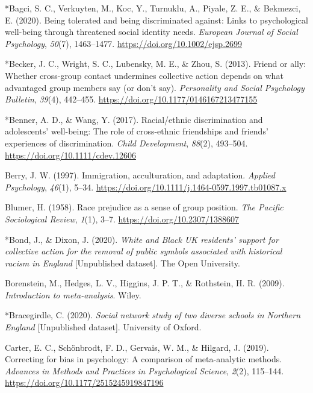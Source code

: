 \documentclass[12pt, letterpaper]{article}
\begin{document}
\leavevmode\hypertarget{ref-2396}{}%
*Bagci, S. C., Verkuyten, M., Koc, Y., Turnuklu, A., Piyale, Z. E., \&
Bekmezci, E. (2020). Being tolerated and being discriminated against:
Links to psychological well-being through threatened social identity
needs. \emph{European Journal of Social Psychology}, \emph{50}(7),
1463--1477. \url{https://doi.org/10.1002/ejsp.2699}

\leavevmode\hypertarget{ref-2075}{}%
*Becker, J. C., Wright, S. C., Lubensky, M. E., \& Zhou, S. (2013).
Friend or ally: Whether cross-group contact undermines collective action
depends on what advantaged group members say (or don't say).
\emph{Personality and Social Psychology Bulletin}, \emph{39}(4),
442--455. \url{https://doi.org/10.1177/0146167213477155}

\leavevmode\hypertarget{ref-1045}{}%
*Benner, A. D., \& Wang, Y. (2017). Racial/ethnic discrimination and
adolescents' well-being: The role of cross-ethnic friendships and
friends' experiences of discrimination. \emph{Child Development},
\emph{88}(2), 493--504. \url{https://doi.org/10.1111/cdev.12606}

\leavevmode\hypertarget{ref-berry_immigration_1997}{}%
Berry, J. W. (1997). Immigration, acculturation, and adaptation.
\emph{Applied Psychology}, \emph{46}(1), 5--34.
\url{https://doi.org/10.1111/j.1464-0597.1997.tb01087.x}

\leavevmode\hypertarget{ref-blumer_race_1958}{}%
Blumer, H. (1958). Race prejudice as a sense of group position.
\emph{The Pacific Sociological Review}, \emph{1}(1), 3--7.
\url{https://doi.org/10.2307/1388607}

\leavevmode\hypertarget{ref-2397}{}%
*Bond, J., \& Dixon, J. (2020). \emph{White and Black UK residents'
support for collective action for the removal of public symbols
associated with historical racism in England} {[}Unpublished dataset{]}.
The Open University.

\leavevmode\hypertarget{ref-borenstein_introduction_2009}{}%
Borenstein, M., Hedges, L. V., Higgins, J. P. T., \& Rothstein, H. R.
(2009). \emph{Introduction to meta-analysis}. Wiley.

\leavevmode\hypertarget{ref-2398}{}%
*Bracegirdle, C. (2020). \emph{Social network study of two diverse
schools in Northern England} {[}Unpublished dataset{]}. University of
Oxford.

\leavevmode\hypertarget{ref-carter_correcting_2019}{}%
Carter, E. C., Schönbrodt, F. D., Gervais, W. M., \& Hilgard, J. (2019).
Correcting for bias in psychology: A comparison of meta-analytic
methods. \emph{Advances in Methods and Practices in Psychological
Science}, \emph{2}(2), 115--144.
\url{https://doi.org/10.1177/2515245919847196}
\end{document}
